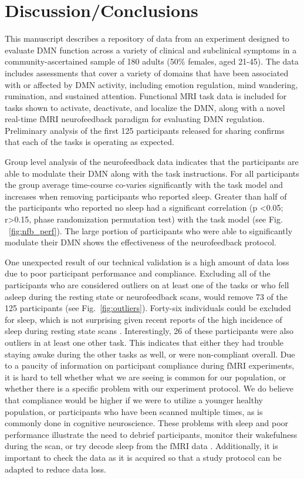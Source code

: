 \section{Discussion/Conclusions}

This manuscript describes a repository of data from an experiment designed to evaluate DMN function across a variety of clinical and subclinical symptoms in a community-ascertained sample of 180 adults (50\% females, aged 21-45). The data includes assessments that cover a variety of domains that have been associated with or affected by DMN activity, including emotion regulation, mind wandering, rumination, and sustained attention. Functional MRI task data is included for tasks shown to activate, deactivate, and localize the DMN, along with a novel real-time fMRI neurofeedback paradigm for evaluating DMN regulation. Preliminary analysis of the first 125 participants released for sharing confirms that each of the tasks is operating as expected.

Group level analysis of the neurofeedback data indicates that the participants are able to modulate their DMN along with the task instructions. For all participants the group average time-course co-varies significantly with the task model and increases when removing participants who reported sleep. Greater than half of the  participants who reported no sleep had a  significant correlation (p \textless 0.05; r\textgreater 0.15, phase randomization permutation test) with the task model (see Fig. ~\ref{fig:nfb_perf}). The large portion of participants who were able to significantly modulate their DMN shows the effectiveness of the neurofeedback protocol.

One unexpected result of our technical validation is a high amount of data loss due to poor participant performance and compliance. Excluding all of the participants who are considered outliers on at least one of the tasks or who fell asleep during the resting state or neurofeedback scans, would remove 73 of the 125 participants (see Fig.~\ref{fig:outliers}). Forty-six individuals could be excluded for sleep, which is not surprising given recent reports of the high incidence of sleep during resting state scans \cite{Tagliazucchi2014}. Interestingly, 26 of these participants were also outliers in at least one other task. This indicates that either they had trouble staying awake during the other tasks as well, or were non-compliant overall. Due to a paucity of information on participant compliance during fMRI experiments, it is hard to tell whether what we are seeing is common for our population, or whether there is a specific problem with our experiment protocol. We do believe that compliance would be higher if we were to utilize a younger healthy population, or participants who have been scanned multiple times, as is commonly done in cognitive neuroscience. These problems with sleep and poor performance illustrate the need to debrief participants, monitor their wakefulness during the scan, or try decode sleep from the fMRI data \cite{Tagliazucchi2014}. Additionally, it is important to check the data as it is acquired so that a study protocol can be adapted to reduce data loss. 

